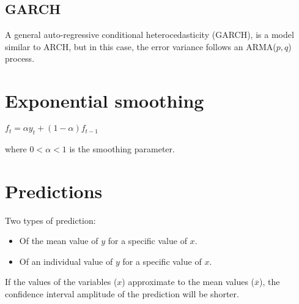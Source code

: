 \documentclass[10pt, a4paper, landscape]{extarticle}
\begin{document}
\begin{multicols}{3}
\subsection*{GARCH}

A general auto-regressive conditional heterocedasticity (GARCH), is a model similar to ARCH, but in this case, the error variance follows an ARMA($p, q$) process.

\section*{Exponential smoothing}

\begin{center}
	$f_t = \alpha y_t + (1 - \alpha) f_{t - 1}$
\end{center}

where $0 < \alpha < 1$ is the smoothing parameter.

\section*{Predictions}

Two types of prediction:

\begin{itemize}[leftmargin=*]
	\item Of the mean value of $y$ for a specific value of $x$.
	\item Of an individual value of $y$ for a specific value of $x$.
\end{itemize}

If the values of the variables ($x$) approximate to the mean values ($\overline{x}$), the confidence interval amplitude of the prediction will be shorter.

\end{multicols}
\end{document}
